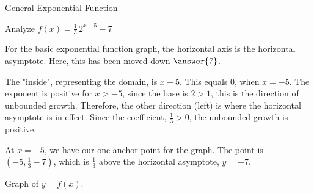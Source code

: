 \documentclass{ximera}
\begin{document}
\begin{example}  General Exponential Function



Analyze   $f(x) = \frac{1}{3} \, 2^{x+5} - 7$ \\


\begin{explanation}

For the basic exponential function graph, the horizontal axis is the horizontal asymptote.  Here, this has been moved down $\answer{7}$.



The "inside", representing the domain, is $x+5$.  This equals $0$, when $x=-5$.  The exponent is positive for $x>-5$, since the base is $2 > 1$, this is the direction of unbounded growth.  Therefore, the other direction (left) is where the horizontal asymptote is in effect.  Since the coefficient, $\frac{1}{3} > 0$, the unbounded growth is positive.

At $x=-5$, we have our one anchor point for the graph.  The point is $\left(-5, \frac{1}{3} - 7 \right)$, which is $\frac{1}{3}$ above the horizontal asymptote, $y = -7$.


Graph of $y = f(x)$.

\begin{image}
\end{image}





\end{explanation}
\end{example}
\end{document}
